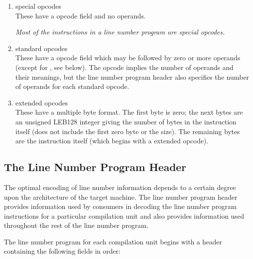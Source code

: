 \begin{enumerate}[1. ]
\item special opcodes \\
These have a \HFTubyte{} opcode field and no operands.\vspace{1ex}

\textit{Most of the instructions in a 
line number program are special opcodes.}

\item standard opcodes \\
These have a \HFTubyte{} opcode field which may be followed by zero or more
 operands (except for 
\mbox{\DWLNSfixedadvancepc,} see below).
The opcode implies the number of operands and their meanings, but the
line number program header also specifies the number of operands for
each standard opcode.

\item extended opcodes \\
These have a multiple byte format. The first byte is zero; the next bytes
are an unsigned LEB128 integer giving the number of bytes in the
instruction itself (does not include the first zero byte or the size). The
remaining bytes are the instruction itself (which begins with a \HFTubyte{}
extended opcode). \\
\end{enumerate}


\subsection{The Line Number Program Header}
\label{chap:linenumberprogramheader}
The optimal encoding of line number information depends to a
certain degree upon the architecture of the target machine. The
line number program header provides information used by
consumers in decoding the line number program instructions for
a particular compilation unit and also provides information
used throughout the rest of the line number program.

The line number program for each compilation unit begins with
a header containing the following fields in order:

